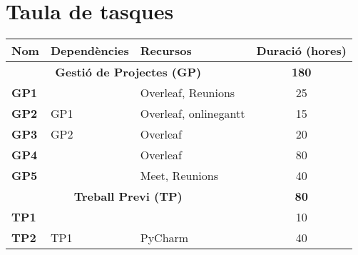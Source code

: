 \section{Taula de tasques}

{\renewcommand{\arraystretch}{1.00} %
{\setlength{\tabcolsep}{1em}   %

\begin{table}[H]
    \centering
    \begin{tabular}{|cllc|}
    \hline
    \multicolumn{1}{|l|}{\textbf{Nom}}          & \multicolumn{1}{l|}{\textbf{Dependències}} & \multicolumn{1}{l|}{\textbf{Recursos}} & \textbf{Duració (hores)} \\ \hline 
    \hline
    \multicolumn{3}{|c|}{\textbf{Gestió de Projectes (GP)}}                             & \textbf{180}             \\ \hline
    \multicolumn{1}{|l|}{\textbf{GP1}}          & \multicolumn{1}{l|}{}                      & \multicolumn{1}{l|}{Overleaf, Reunions} & 25                       \\ \hline
    \multicolumn{1}{|l|}{\textbf{GP2}}          & \multicolumn{1}{l|}{GP1}                      & \multicolumn{1}{l|}{Overleaf, onlinegantt}       & 15                       \\ \hline
    \multicolumn{1}{|l|}{\textbf{GP3}}          & \multicolumn{1}{l|}{GP2}                      & \multicolumn{1}{l|}{Overleaf}               & 20                       \\ \hline
    \multicolumn{1}{|l|}{\textbf{GP4}}          & \multicolumn{1}{l|}{}                      & \multicolumn{1}{l|}{Overleaf}                  & 80                       \\ \hline
    \multicolumn{1}{|l|}{\textbf{GP5}}          & \multicolumn{1}{l|}{}                      & \multicolumn{1}{l|}{Meet, Reunions}    & 40                       \\ \hline
    \hline
    \multicolumn{3}{|c|}{\textbf{Treball Previ (TP)}}                                   & \textbf{80}              \\ \hline
    \multicolumn{1}{|l|}{\textbf{TP1}}          & \multicolumn{1}{l|}{}                      & \multicolumn{1}{l|}{}                  & 10                       \\ \hline
    \multicolumn{1}{|l|}{\textbf{TP2}}          & \multicolumn{1}{l|}{TP1}                      & \multicolumn{1}{l|}{PyCharm}        & 40                       \\ \hline

\end{tabular}
\end{table}}}
